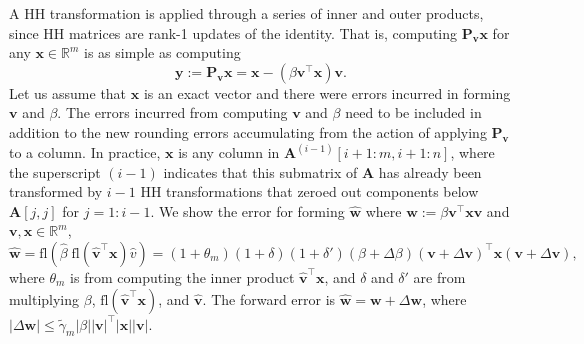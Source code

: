 \documentclass[review,onefignum,onetabnum]{siamart190516}
\newcommand{\R}{\mathbb{R}}
\newcommand{\dd}{\delta}
\newcommand{\tth}{\theta}
\newcommand{\bb}[1]{\mathbf{#1}}
\newcommand{\fl}{\mathrm{fl}}
\begin{document}
A HH transformation is applied through a series of inner and outer products, since HH matrices are rank-1 updates of the identity. 
That is, computing  $\bb{P}_{\bb{v}}\bb{x}$ for any $\bb{x}\in\R^{m}$ is as simple as computing 
\begin{equation}
\bb{y}:=\bb{P}_{\bb{v}}\bb{x} = \bb{x} - (\beta \bb{v}^{\top}\bb{x})\bb{v}.\label{eqn:effH}
\end{equation}
Let us assume that $\bb{x}$ is an exact vector and there were errors incurred in forming $\bb{v}$ and $\beta$. 
The errors incurred from computing $\bb{v}$ and $\beta$ need to be included in addition to the new rounding errors accumulating from the action of applying $\bb{P}_{\bb{v}}$ to a column.
In practice, $\bb{x}$ is any column in $\bb{A}^{(i-1)}[i+1:m, i+1:n]$, where the superscript $(i-1)$ indicates that this submatrix of $\bb{A}$ has already been transformed by $i-1$ HH transformations that zeroed out components below $\bb{A}[j,j]$ for $j = 1:i-1$.
We show the error for forming $\hat{\bb{w}}$ where $\bb{w}:=\beta\bb{v}^{\top}\bb{x}\bb{v}$ and $\bb{v},\bb{x}\in\R^{m}$,
\begin{equation*}
\hat{\bb{w}} =\fl(\hat{\beta}\;\fl(\hat{\bb{v}}^{\top}\bb{x})\hat{v})=(1+\tth_{m})(1+\dd)(1+\dd')(\beta+\Delta\beta)(\bb{v}+\Delta \bb{v})^{\top}\bb{x}(\bb{v}+\Delta \bb{v}),
\end{equation*}
where $\tth_{m}$ is from computing the inner product $\hat{\bb{v}}^{\top}\bb{x}$, and $\dd$ and $\dd'$ are from multiplying $\beta$, $\fl(\hat{\bb{v}}^{\top}\bb{x})$, and $\bb{\hat{v}}$.
The forward error is
$\hat{\bb{w}} = \bb{w} + \Delta \bb{w}$, where $|\Delta \bb{w}| \leq \tilde{\gamma}_m|\beta||\bb{v}|^{\top}|\bb{x}||\bb{v}|.$
\end{document}

